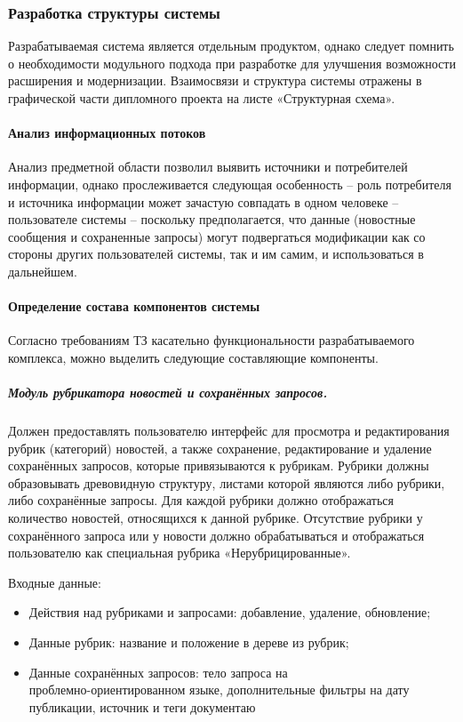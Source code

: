 \subsubsection{Разработка структуры системы}

Разрабатываемая система является отдельным продуктом, однако следует помнить о необходимости модульного подхода при разработке для улучшения возможности расширения и модернизации. Взаимосвязи и структура системы отражены в графической части дипломного проекта на листе «Структурная схема».

\paragraph{Анализ информационных потоков} \hfill

Анализ предметной области позволил выявить источники и потребителей информации, однако прослеживается следующая особенность -- роль потребителя и источника информации может зачастую совпадать в одном человеке -- пользователе системы -- поскольку предполагается, что данные (новостные сообщения и сохраненные запросы) могут подвергаться модификации как со стороны других пользователей системы, так и им самим, и использоваться в дальнейшем.

\paragraph{Определение состава компонентов системы} \hfill

Согласно требованиям ТЗ касательно функциональности разрабатываемого комплекса, можно выделить следующие составляющие компоненты.

\subparagraph{Модуль рубрикатора новостей и сохранённых запросов.} \hfill

Должен предоставлять пользователю интерфейс для просмотра и редактирования рубрик (категорий) новостей, а также сохранение, редактирование и удаление сохранённых запросов, которые привязываются к рубрикам. Рубрики должны образовывать древовидную структуру, листами которой являются либо рубрики, либо сохранённые запросы. Для каждой рубрики должно отображаться количество новостей, относящихся к данной рубрике. Отсутствие рубрики у сохранённого запроса или у новости должно обрабатываться и отображаться пользователю как специальная рубрика «Нерубрицированные».

Входные данные:
\begin{itemize}
\item Действия над рубриками и запросами: добавление, удаление, обновление;
\item Данные рубрик: название и положение в дереве из рубрик;
\item Данные сохранённых запросов: тело запроса на \\ проблемно-ориентированном языке, дополнительные фильтры на дату публикации, источник и теги документаю
\end{itemize}

